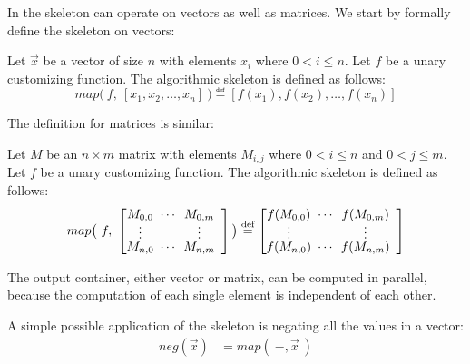 In \SkelCL the \map skeleton can operate on vectors as well as matrices.
We start by formally define the skeleton on vectors:
\begin{definition}
  \label{definition:map}
  Let $\vec{x}$ be a vector of size $n$ with elements $x_i$ where $0 < i \leq n$.
  Let $f$ be a unary customizing function.
  The algorithmic skeleton \map is defined as follows:
  \begin{equation*}
    map \big(\ f,\ [x_1, x_2, \dots, x_n]\ \big) \eqdef [f(x_1), f(x_2), \dots, f(x_n)]
  \end{equation*}
\end{definition}
\noindent
The definition for matrices is similar:
\begin{definition}
  \label{definition:map:matrix}
  Let $M$ be an $n\times m$ matrix with elements $M_{i,j}$ where $0 < i \leq n$ and $0 < j \leq m$.
  Let $f$ be a unary customizing function.
  The algorithmic skeleton \map is defined as follows:
  \begin{equation*}
    map\big(\ f,\ \DottedMatrix{M_{0,0}}{M_{0,m}}{M_{n,0}}{M_{n,m}} \big)
      \eqdef \DottedMatrix{f(M_{0,0})}{f(M_{0,m})}{f(M_{n,0})}{f(M_{n,m})}
  \end{equation*}
\end{definition}
\noindent
The output container, either vector or matrix, can be computed in parallel, because the computation of each single element is independent of each other.

A simple possible application of the \map skeleton is negating all the values in a vector:
\begin{align*}
  neg(\vec{x}) &= map(\ -, \vec{x}\ )
\end{align*}


